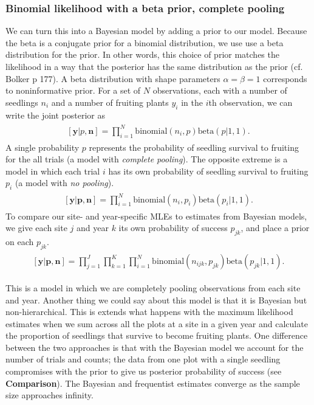 \documentclass[12pt, oneside, titlepage]{article}   	%
\begin{document}
\subsubsection*{Binomial likelihood with a beta prior, complete pooling}

We can turn this into a Bayesian model by adding a prior to our model. Because the beta is a conjugate prior for a binomial distribution, we use use a beta distribution for the prior. In other words, this choice of prior matches the likelihood in a way that the posterior has the same distribution as the prior (cf. Bolker p 177). A beta distribution with shape parameters $\alpha=\beta=1$ corresponds to noninformative prior. For a set of $N$ observations, each with a number of seedlings $n_i$ and a number of fruiting plants $y_i$ in the $i$th observation, we can write the joint posterior as
%
\begin{align}
  \begin{split}
[\bm{y}|p,\bm{n}]  = \prod_{i=1}^N \mathrm{binomial}(n_i,p) \mathrm{beta} (  p | 1 , 1 ).
  \end{split}
\end{align}
%
A single probability $p$ represents the probability of seedling survival to fruiting for the all trials (a model with \textit{complete pooling}). The opposite extreme is a model in which each trial $i$ has its own probability of seedling survival to fruiting $p_i$ (a model with \textit{no pooling}). 
%
\begin{align}
  \begin{split}
[\bm{y}|\bm{p},\bm{n}]  = \prod_{i=1}^N \mathrm{binomial}(n_i,p_i) \mathrm{beta} (  p_i | 1 , 1 ).
  \end{split}
\end{align}
%
To compare our site- and year-specific MLEs to estimates from Bayesian models, we give each site $j$ and year $k$ its own probability of success $p_{jk}$, and place a prior on each $p_{jk}$.
%
\begin{align}
  \begin{split}
[\bm{y}|\bm{p},\bm{n}]  = \prod_{j=1}^J\prod_{k=1}^K\prod_{i=1}^N \mathrm{binomial}(n_{ijk},p_{jk}) \mathrm{beta} (  p_{jk} | 1 , 1 ). \label{eq:bayesianNH}
  \end{split}
\end{align}
%

This is a model in which we are completely pooling observations from each site and year.  Another thing we could say about this model is that it is Bayesian but non-hierarchical. This is extends what happens with the maximum likelihood estimates when we sum across all the plots at a site in a given year and calculate the proportion of seedlings that survive to become fruiting plants. One difference between the two approaches is that with the Bayesian model we account for the number of trials and counts; the data from one plot with a single seedling compromises with the prior to give us posterior probability of success (see \textbf{Comparison}). The Bayesian and frequentist estimates converge as the sample size approaches infinity. 
\end{document}
